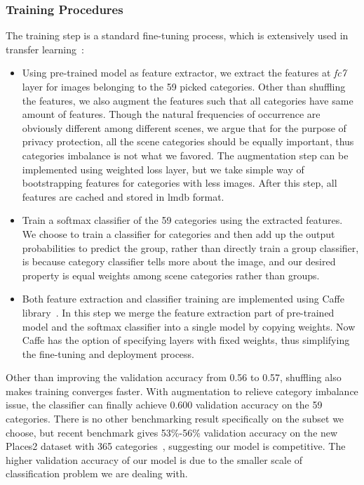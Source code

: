 \subsubsection{Training Procedures}
The training step is a standard fine-tuning process, which is extensively used in transfer learning~\cite{sharif2014cnn,yosinski2014transferable}:

\begin{itemize}
\item[\ding{182}] Using pre-trained model as feature extractor, we extract the features at \emph{fc7} layer for images belonging to the 59 picked categories. Other than shuffling the features, we also augment the features such that all categories have same amount of features. Though the natural frequencies of occurrence are obviously different among different scenes, we argue that for the purpose of privacy protection, all the scene categories should be equally important, thus categories imbalance is not what we favored. The augmentation step can be implemented using weighted loss layer, but we take simple way of bootstrapping features for categories with less images. After this step, all features are cached and stored in lmdb format.
\item[\ding{183}] Train a softmax classifier of the 59 categories using the extracted features. We choose to train a classifier for categories and then add up the output probabilities to predict the group, rather than directly train a group classifier, is because category classifier tells more about the image, and our desired property is equal weights among scene categories rather than groups.
\item[\ding{184}] Both feature extraction and classifier training are implemented using Caffe library~\cite{links:caffelib,jia2014caffe}. In this step we merge the feature extraction part of pre-trained model and the softmax classifier into a single model by copying weights. Now Caffe has the option of specifying layers with fixed weights, thus simplifying the fine-tuning and deployment process.
\end{itemize}

Other than improving the validation accuracy from 0.56 to 0.57, shuffling also makes training converges faster. With augmentation to relieve category imbalance issue, the classifier can finally achieve 0.600 validation accuracy on the 59 categories. There is no other benchmarking result specifically on the subset we choose, but recent benchmark gives 53\%-56\% validation accuracy on the new Places2 dataset with 365 categories~\cite{links:places2pre}, suggesting our model is competitive. The higher validation accuracy of our model is due to the smaller scale of classification problem we are dealing with.

